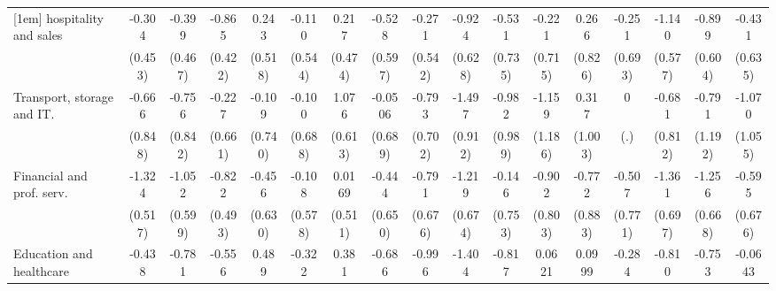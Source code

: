{\begin{tabular}{l*{16}{c}}
[1em]
hospitality and sales&      -0.304         &      -0.399         &      -0.865\sym{*}  &       0.243         &      -0.110         &       0.217         &      -0.528         &      -0.271         &      -0.924         &      -0.531         &      -0.221         &       0.266         &      -0.251         &      -1.140\sym{*}  &      -0.899         &      -0.431         \\
                    &     (0.453)         &     (0.467)         &     (0.422)         &     (0.518)         &     (0.544)         &     (0.474)         &     (0.597)         &     (0.542)         &     (0.628)         &     (0.735)         &     (0.715)         &     (0.826)         &     (0.693)         &     (0.577)         &     (0.604)         &     (0.635)         \\
[1em]
Transport, storage and IT.&      -0.666         &      -0.756         &      -0.227         &      -0.109         &      -0.100         &       1.076         &     -0.0506         &      -0.793         &      -1.497         &      -0.982         &      -1.159         &       0.317         &           0         &      -0.681         &      -0.791         &      -1.070         \\
                    &     (0.848)         &     (0.842)         &     (0.661)         &     (0.740)         &     (0.688)         &     (0.613)         &     (0.689)         &     (0.702)         &     (0.912)         &     (0.989)         &     (1.186)         &     (1.003)         &         (.)         &     (0.812)         &     (1.192)         &     (1.055)         \\
[1em]
Financial and prof. serv.&      -1.324\sym{*}  &      -1.052         &      -0.822         &      -0.456         &      -0.108         &      0.0169         &      -0.444         &      -0.791         &      -1.219         &      -0.146         &      -0.902         &      -0.772         &      -0.507         &      -1.361         &      -1.256         &      -0.595         \\
                    &     (0.517)         &     (0.599)         &     (0.493)         &     (0.630)         &     (0.578)         &     (0.511)         &     (0.650)         &     (0.676)         &     (0.674)         &     (0.753)         &     (0.803)         &     (0.883)         &     (0.771)         &     (0.697)         &     (0.668)         &     (0.676)         \\
[1em]
Education and healthcare&      -0.438         &      -0.781         &      -0.556         &       0.489         &      -0.322         &       0.381         &      -0.686         &      -0.996         &      -1.404\sym{*}  &      -0.817         &      0.0621         &      0.0999         &      -0.284         &      -0.810         &      -0.753         &     -0.0643         \\

\end{tabular}}
